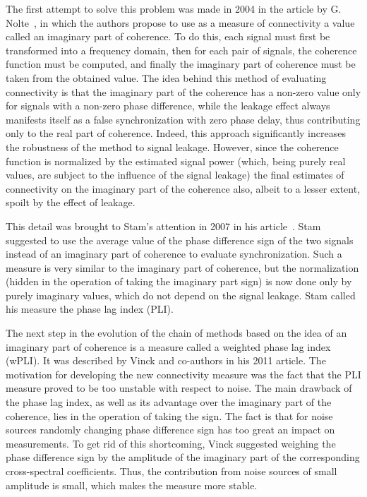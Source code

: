 The first attempt to solve this problem was made in 2004 in the article by G.
Nolte~\cite{imcoh}, in which the authors propose to use as a measure of
connectivity a value called an imaginary part of coherence.  To do this, each
signal must first be transformed into a frequency domain, then for each pair of
signals, the coherence function must be computed, and finally the imaginary
part of coherence must be taken from the obtained value.  The idea behind this
method of evaluating connectivity is that the imaginary part of the coherence
has a non-zero value only for signals with a non-zero phase difference, while
the leakage effect always manifests itself as a false synchronization with zero
phase delay, thus contributing only to the real part of coherence. Indeed, this
approach significantly increases the robustness of the method to signal
leakage. However, since the coherence function is normalized by the estimated
signal power (which, being purely real values, are subject to the influence of
the signal leakage) the final estimates of connectivity on the imaginary part
of the coherence also, albeit to a lesser extent, spoilt by the effect of
leakage.

This detail was brought to Stam's attention in 2007 in his article~\cite{PLI}.
Stam suggested to use the average value of the phase difference sign of the two
signals instead of an imaginary part of coherence to evaluate synchronization.
Such a measure is very similar to the imaginary part of coherence, but the
normalization (hidden in the operation of taking the imaginary part sign) is
now done only by purely imaginary values, which do not depend on the signal
leakage. Stam called his measure the phase lag index (PLI).

The next step in the evolution of the chain of methods based on the idea of an
imaginary part of coherence is a measure called a weighted phase lag index
(wPLI). It was described by Vinck and co-authors in his 2011 article. The
motivation for developing the new connectivity measure was the fact that the
PLI measure proved to be too unstable with respect to noise. The main drawback
of the phase lag index, as well as its advantage over the imaginary part of the
coherence, lies in the operation of taking the sign.  The fact is that for
noise sources randomly changing phase difference sign has too great an impact
on measurements. To get rid of this shortcoming, Vinck suggested weighing the
phase difference sign by the amplitude of the imaginary part of the
corresponding cross-spectral coefficients. Thus, the contribution from noise
sources of small amplitude is small, which makes the measure more stable.

